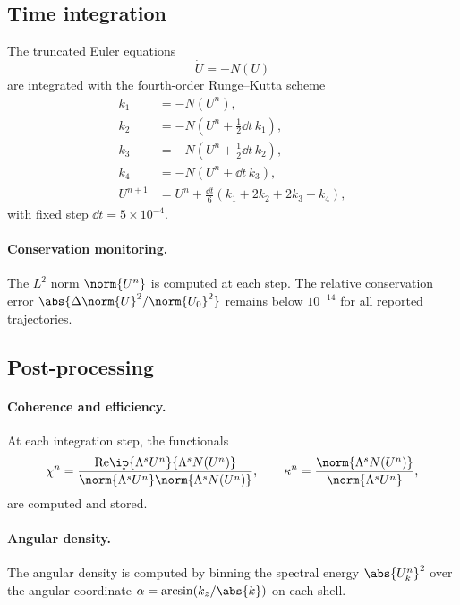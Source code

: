 \subsection{Time integration}
\label{ssec:D-time}

The truncated Euler equations
\begin{equation}\label{eq:D-euler}
\dot U = -N(U)
\end{equation}
are integrated with the fourth-order Runge--Kutta scheme
\begin{align}
k_1 &= -N(U^n), \\
k_2 &= -N(U^n + \tfrac12\dd t\, k_1), \\
k_3 &= -N(U^n + \tfrac12\dd t\, k_2), \\
k_4 &= -N(U^n + \dd t\, k_3), \\
U^{n+1} &= U^n + \tfrac{\dd t}{6}(k_1 + 2k_2 + 2k_3 + k_4),
\end{align}
with fixed step $\dd t = 5\times 10^{-4}$.

\paragraph{Conservation monitoring.}
The $L^2$ norm $\norm{U^n}$ is computed at each step. The relative 
conservation error $\abs{\Delta\norm{U}^2/\norm{U_0}^2}$ remains 
below $10^{-14}$ for all reported trajectories.

\subsection{Post-processing}
\label{ssec:D-post}

\paragraph{Coherence and efficiency.}
At each integration step, the functionals
\begin{equation}\label{eq:D-chi-kappa}
\chi^n = \frac{\mathrm{Re}\ip{\Lambda^s U^n}{\Lambda^s N(U^n)}}
              {\norm{\Lambda^s U^n}\norm{\Lambda^s N(U^n)}},
\qquad
\kappa^n = \frac{\norm{\Lambda^s N(U^n)}}{\norm{\Lambda^s U^n}},
\end{equation}
are computed and stored.

\paragraph{Angular density.}
The angular density is computed by binning the spectral energy 
$\abs{U^n_k}^2$ over the angular coordinate 
$\alpha = \arcsin(k_z/\abs{k})$ on each shell.

